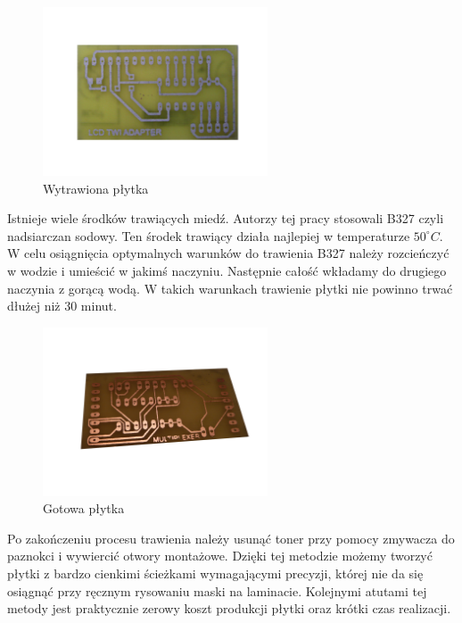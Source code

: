 \begin{figure}[!ht]
 \centering
 \includegraphics[height=50mm]{../images/appendix/wytrawiona.JPG}
 \caption{Wytrawiona płytka}
 \label{fig:PlytkaZTonerem}
\end{figure}

Istnieje wiele środków trawiących miedź. Autorzy tej pracy stosowali B327 czyli nadsiarczan sodowy. Ten środek trawiący działa najlepiej w temperaturze $50^{\circ}C$. W celu osiągnięcia optymalnych warunków do trawienia B327 należy rozcieńczyć w wodzie i umieścić w jakimś naczyniu. Następnie całość wkładamy do drugiego naczynia z gorącą wodą. W takich warunkach trawienie płytki nie powinno trwać dłużej niż 30 minut.

\begin{figure}[!ht]
 \centering
 \includegraphics[height=50mm]{../images/appendix/gotowa.JPG}
 \caption{Gotowa płytka}
 \label{fig:PlytkaZTonerem}
\end{figure}

Po zakończeniu procesu trawienia należy usunąć toner przy pomocy zmywacza do paznokci i wywiercić otwory montażowe. Dzięki tej metodzie możemy tworzyć płytki z bardzo cienkimi ścieżkami wymagającymi precyzji, której nie da się osiągnąć przy ręcznym rysowaniu maski na laminacie. Kolejnymi atutami tej metody jest praktycznie zerowy koszt produkcji płytki oraz krótki czas realizacji.
